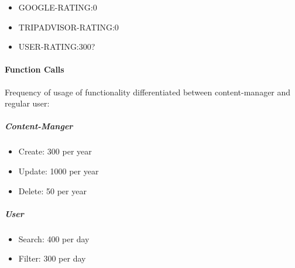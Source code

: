 \vspace{8px}

\begin{itemize}
\item GOOGLE-RATING:0
\item TRIPADVISOR-RATING:0
\item USER-RATING:300?
\end{itemize}




\paragraph{Function Calls}
Frequency of usage of functionality differentiated between content-manager and regular user:
\subparagraph{Content-Manger}
\begin{itemize}
\item Create:	300 per year
\item Update: 1000 per year
\item Delete: 50 per year
\end{itemize}

\subparagraph{User}
\begin{itemize}
\item Search: 400 per day
\item Filter:	300 per day
\end{itemize}
